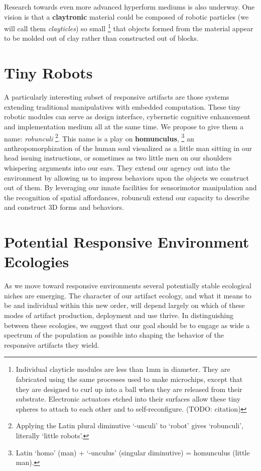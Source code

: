 Research towards even more advanced hyperform mediums is also underway. One vision is that a \textbf{claytronic} \citep{goldstein_computer2005} material could be composed of robotic particles (we will call them \emph{clayticles}) so small%
\footnote{Individual clayticle modules are less than 1mm in diameter. 
They are fabricated using the same processes used to make microchips, except that they are designed to curl up into a ball when they are released from their substrate.
Electronic actuators etched into their surfaces allow these tiny spheres to attach to each other and to self{}-reconfigure. (TODO: citation)}
that objects formed from the material appear to be molded out of clay rather than constructed out of blocks.

\section{Tiny Robots}
%
A particularly interesting subset of responsive artifacts are those systems extending traditional manipulatives with embedded computation.
These tiny robotic modules can serve as design interface, cybernetic cognitive enhancement and implementation medium all at the same time. We propose to give them a name: \emph{robunculi}%
\footnote{Applying the Latin plural diminutive `-unculi' to `robot' gives `robunculi', literally `little robots'.}.
This name is a play on \textbf{homunculus},%
\footnote{Latin `homo' (man) + `-unculus' (singular diminutive) = homunculus (little man).}
an anthropomorphization of the human soul visualized as a little man sitting in our head issuing instructions, or sometimes as two little men on our shoulders whispering arguments into our ears. 
They extend our agency out into the environment by allowing us to impress behaviors upon the objects we construct out of them. 
By leveraging our innate facilities for sensorimotor manipulation and the recognition of spatial affordances, robunculi extend our capacity to describe and construct 3D forms and behaviors.

\section{Potential Responsive Environment Ecologies}
%
As we move toward responsive environments several potentially stable ecological niches are emerging. 
The character of our artifact ecology, and what it means to be and individual within this new order, will depend largely on which of these modes of artifact production, deployment and use thrive. 
In distinguishing between these ecologies, we suggest that our goal should be to engage as wide a spectrum of the population as possible into shaping the behavior of the responsive artifacts they wield. 

